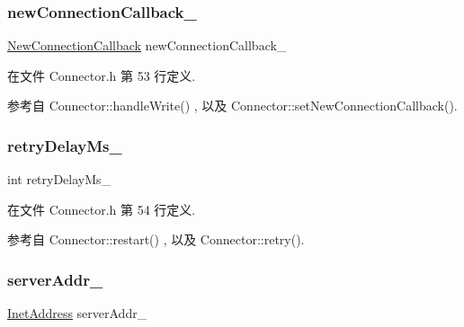 \subsubsection{\texorpdfstring{new\+Connection\+Callback\+\_\+}{newConnectionCallback\_}}
{\footnotesize\ttfamily \hyperlink{classmuduo_1_1Connector_a74d0c9e28e41cb2b3310e0c1d3671710}{New\+Connection\+Callback} new\+Connection\+Callback\+\_\+\hspace{0.3cm}{\ttfamily [private]}}



在文件 Connector.\+h 第 53 行定义.



参考自 Connector\+::handle\+Write() , 以及 Connector\+::set\+New\+Connection\+Callback().

\mbox{\label{classmuduo_1_1Connector_a22e73d8243605061d5201effe673e2bc}} 
\subsubsection{\texorpdfstring{retry\+Delay\+Ms\+\_\+}{retryDelayMs\_}}
{\footnotesize\ttfamily int retry\+Delay\+Ms\+\_\+\hspace{0.3cm}{\ttfamily [private]}}



在文件 Connector.\+h 第 54 行定义.



参考自 Connector\+::restart() , 以及 Connector\+::retry().

\mbox{\label{classmuduo_1_1Connector_a70de848a60434ed7c6f33ba257fdbbfe}} 
\subsubsection{\texorpdfstring{server\+Addr\+\_\+}{serverAddr\_}}
{\footnotesize\ttfamily \hyperlink{classmuduo_1_1InetAddress}{Inet\+Address} server\+Addr\+\_\+\hspace{0.3cm}{\ttfamily [private]}}



